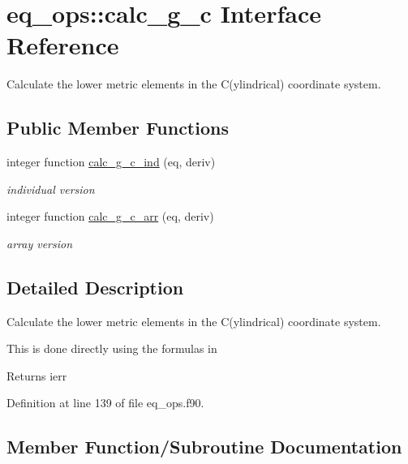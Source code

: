 \hypertarget{interfaceeq__ops_1_1calc__g__c}{}\section{eq\+\_\+ops\+:\+:calc\+\_\+g\+\_\+c Interface Reference}
\label{interfaceeq__ops_1_1calc__g__c}


Calculate the lower metric elements in the C(ylindrical) coordinate system.  


\subsection*{Public Member Functions}
\begin{DoxyCompactItemize}
\item 
integer function \hyperlink{interfaceeq__ops_1_1calc__g__c_a55dca52f3f82960703162dba425d358d}{calc\+\_\+g\+\_\+c\+\_\+ind} (eq, deriv)
\begin{DoxyCompactList}\small\item\em individual version \end{DoxyCompactList}\item 
integer function \hyperlink{interfaceeq__ops_1_1calc__g__c_a1694c8a9df96ab63255d533539020887}{calc\+\_\+g\+\_\+c\+\_\+arr} (eq, deriv)
\begin{DoxyCompactList}\small\item\em array version \end{DoxyCompactList}\end{DoxyCompactItemize}


\subsection{Detailed Description}
Calculate the lower metric elements in the C(ylindrical) coordinate system. 

This is done directly using the formula\textquotesingle{}s in \cite{Weyens3D}

\begin{DoxyReturn}{Returns}
ierr 
\end{DoxyReturn}


Definition at line 139 of file eq\+\_\+ops.\+f90.



\subsection{Member Function/\+Subroutine Documentation}
\mbox{\label{interfaceeq__ops_1_1calc__g__c_a1694c8a9df96ab63255d533539020887}} 
